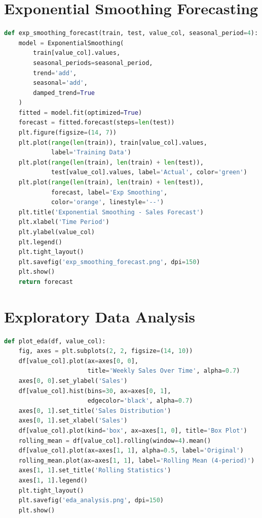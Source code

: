 \documentclass[12pt,a4paper]{report}
\begin{document}
\section{Exponential Smoothing Forecasting}
\begin{lstlisting}[language=Python, caption={Exponential Smoothing model}]
def exp_smoothing_forecast(train, test, value_col, seasonal_period=4):
    model = ExponentialSmoothing(
        train[value_col].values,
        seasonal_periods=seasonal_period,
        trend='add',
        seasonal='add',
        damped_trend=True
    )
    fitted = model.fit(optimized=True)
    forecast = fitted.forecast(steps=len(test))
    plt.figure(figsize=(14, 7))
    plt.plot(range(len(train)), train[value_col].values,
             label='Training Data')
    plt.plot(range(len(train), len(train) + len(test)),
             test[value_col].values, label='Actual', color='green')
    plt.plot(range(len(train), len(train) + len(test)),
             forecast, label='Exp Smoothing',
             color='orange', linestyle='--')
    plt.title('Exponential Smoothing - Sales Forecast')
    plt.xlabel('Time Period')
    plt.ylabel(value_col)
    plt.legend()
    plt.tight_layout()
    plt.savefig('exp_smoothing_forecast.png', dpi=150)
    plt.show()
    return forecast
\end{lstlisting}

\section{Exploratory Data Analysis}
\begin{lstlisting}[language=Python, caption={EDA visualization function}]
def plot_eda(df, value_col):
    fig, axes = plt.subplots(2, 2, figsize=(14, 10))
    df[value_col].plot(ax=axes[0, 0],
                       title='Weekly Sales Over Time', alpha=0.7)
    axes[0, 0].set_ylabel('Sales')
    df[value_col].hist(bins=30, ax=axes[0, 1],
                       edgecolor='black', alpha=0.7)
    axes[0, 1].set_title('Sales Distribution')
    axes[0, 1].set_xlabel('Sales')
    df[value_col].plot(kind='box', ax=axes[1, 0], title='Box Plot')
    rolling_mean = df[value_col].rolling(window=4).mean()
    df[value_col].plot(ax=axes[1, 1], alpha=0.5, label='Original')
    rolling_mean.plot(ax=axes[1, 1], label='Rolling Mean (4-period)')
    axes[1, 1].set_title('Rolling Statistics')
    axes[1, 1].legend()
    plt.tight_layout()
    plt.savefig('eda_analysis.png', dpi=150)
    plt.show()
\end{lstlisting}
\end{document}

